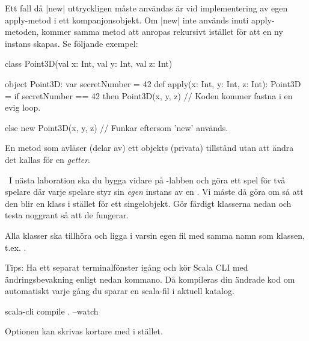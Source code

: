 Ett fall då \code|new| uttryckligen måste användas är vid implementering av egen apply-metod i ett kompanjonsobjekt. Om \code|new| inte används inuti apply-metoden, kommer samma metod att anropas rekursivt istället för att en ny instans skapas. Se följande exempel:

\begin{Code}
class Point3D(val x: Int, val y: Int, val z: Int)

object Point3D:
  var secretNumber = 42
  def apply(x: Int, y: Int, z: Int): Point3D =
    if secretNumber == 42 then
      Point3D(x, y, z) // Koden kommer fastna i en evig loop.

    else new Point3D(x, y, z) // Funkar eftersom 'new' används.
\end{Code}



\SubtaskSolved En metod som avläser (delar av) ett objekts (privata) tillstånd utan att ändra det kallas för en \emph{getter}.

\QUESTEND



\QUESTBEGIN

\Task\label{exe:classes:labprep}  \what~I nästa laboration ska du bygga vidare på -labben och göra ett spel för två spelare där varje spelare styr sin \emph{egen} instans av en . Vi måste då göra om  så att den blir en klass i stället för ett singelobjekt. Gör färdigt klasserna nedan och testa noggrant så att de fungerar. 

Alla klasser ska tillhöra  och ligga i varsin egen fil med samma namn som klassen, t.ex. . 

Tips: Ha ett separat terminalfönster igång och kör Scala CLI med ändringsbevakning enligt nedan kommano. Då kompileras din ändrade kod om automatiskt varje gång du sparar en scala-fil i aktuell katalog.
\begin{REPLnonum}
scala-cli compile . --watch
\end{REPLnonum}
Optionen  kan skrivas kortare med  i stället.

